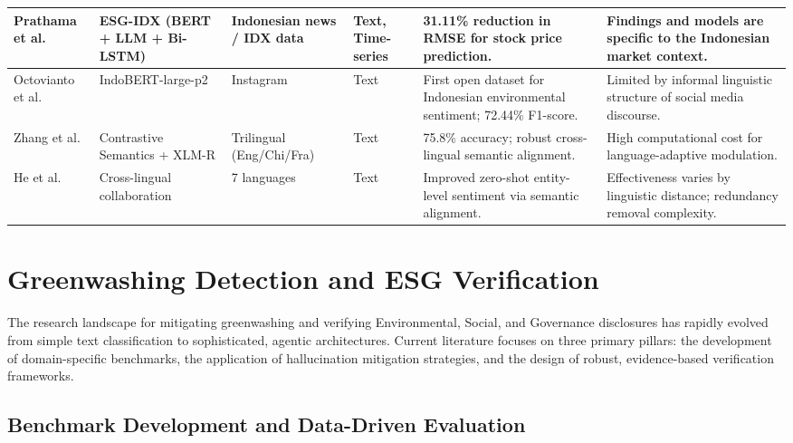 \begin{landscape}
\begin{table}[p]
\begin{tabularx}{\linewidth}{|p{1.8cm}|p{3cm}|p{3cm}|p{1.8cm}|X|X|}
Prathama et al.  \parencite{ubaidillah_ariq_prathama_a1856e2f} & ESG-IDX (BERT + LLM + Bi-LSTM) & Indonesian news / IDX data & Text, Time-series & 31.11\% reduction in RMSE for stock price prediction. & Findings and models are specific to the Indonesian market context. \\ \hline
Octovianto et al.  \parencite{christofer_octovianto_487e90aa} & IndoBERT-large-p2 & Instagram & Text & First open dataset for Indonesian environmental sentiment; 72.44\% F1-score. & Limited by informal linguistic structure of social media discourse. \\ \hline
Zhang et al.  \parencite{liman_zhang_ec332205} & Contrastive Semantics + XLM-R & Trilingual (Eng/Chi/Fra) & Text & 75.8\% accuracy; robust cross-lingual semantic alignment. & High computational cost for language-adaptive modulation. \\ \hline
He et al.  \parencite{association_for_computational_linguistics_2025_5a25f994} & Cross-lingual collaboration & 7 languages & Text & Improved zero-shot entity-level sentiment via semantic alignment. & Effectiveness varies by linguistic distance; redundancy removal complexity. \\ \hline
\end{tabularx}
\end{table}
\end{landscape}

\section{Greenwashing Detection and ESG Verification}

The research landscape for mitigating greenwashing and verifying Environmental, Social, and Governance disclosures has rapidly evolved from simple text classification to sophisticated, agentic architectures. Current literature focuses on three primary pillars: the development of domain-specific benchmarks, the application of hallucination mitigation strategies, and the design of robust, evidence-based verification frameworks.
\subsection{Benchmark Development and Data-Driven Evaluation}

